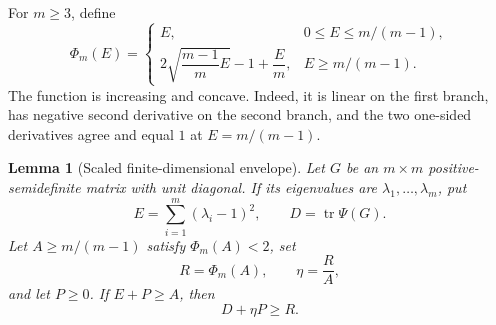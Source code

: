 \documentclass[11pt]{amsart}
\newtheorem{lemma}[theorem]{Lemma}
\theoremstyle{remark}
\DeclareMathOperator{\tr}{tr}
\begin{document}
For $m\ge3$, define
\begin{equation}\label{eq:phi}
 \Phi_m(E)=
 \begin{cases}
  E,&0\le E\le m/(m-1),\\[2mm]
  2\sqrt{\dfrac{m-1}{m}E}-1+\dfrac Em,
    &E\ge m/(m-1).
 \end{cases}
\end{equation}
The function is increasing and concave.  Indeed, it is linear on the first
branch, has negative second derivative on the second branch, and the two
one-sided derivatives agree and equal $1$ at $E=m/(m-1)$.

\begin{lemma}[Scaled finite-dimensional envelope]\label{lem:scaled}
Let $G$ be an $m\times m$ positive-semidefinite matrix with unit diagonal.
If its eigenvalues are $\lambda_1,\ldots,\lambda_m$, put
\[
 E=\sum_{i=1}^m(\lambda_i-1)^2,
 \qquad D=\tr\Psi(G).
\]
Let $A\ge m/(m-1)$ satisfy $\Phi_m(A)<2$, set
\[
 R=\Phi_m(A),\qquad \eta=\frac RA,
\]
and let $P\ge0$.  If $E+P\ge A$, then
\begin{equation}\label{eq:scaled}
 D+\eta P\ge R.
\end{equation}
\end{lemma}
\end{document}
